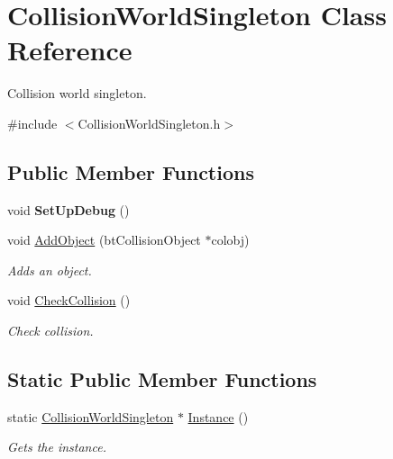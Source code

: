 \hypertarget{class_collision_world_singleton}{\section{Collision\-World\-Singleton Class Reference}
\label{class_collision_world_singleton}
}


Collision world singleton.  




{\ttfamily \#include $<$Collision\-World\-Singleton.\-h$>$}

\subsection*{Public Member Functions}
\begin{DoxyCompactItemize}
\item 
\hypertarget{class_collision_world_singleton_a7b73e1b5f14b7b48d049f81a374d4772}{void {\bfseries Set\-Up\-Debug} ()}\label{class_collision_world_singleton_a7b73e1b5f14b7b48d049f81a374d4772}

\item 
void \hyperlink{class_collision_world_singleton_a6f2803fe6954a758a065718929103282}{Add\-Object} (bt\-Collision\-Object $\ast$colobj)
\begin{DoxyCompactList}\small\item\em Adds an object. \end{DoxyCompactList}\item 
void \hyperlink{class_collision_world_singleton_a4c8e153ddb2ac08f21eaa181741c7521}{Check\-Collision} ()
\begin{DoxyCompactList}\small\item\em Check collision. \end{DoxyCompactList}\end{DoxyCompactItemize}
\subsection*{Static Public Member Functions}
\begin{DoxyCompactItemize}
\item 
static \hyperlink{class_collision_world_singleton}{Collision\-World\-Singleton} $\ast$ \hyperlink{class_collision_world_singleton_ac582bf5f99e95541fbc6fe7c4a655c1a}{Instance} ()
\begin{DoxyCompactList}\small\item\em Gets the instance. \end{DoxyCompactList}\end{DoxyCompactItemize}
